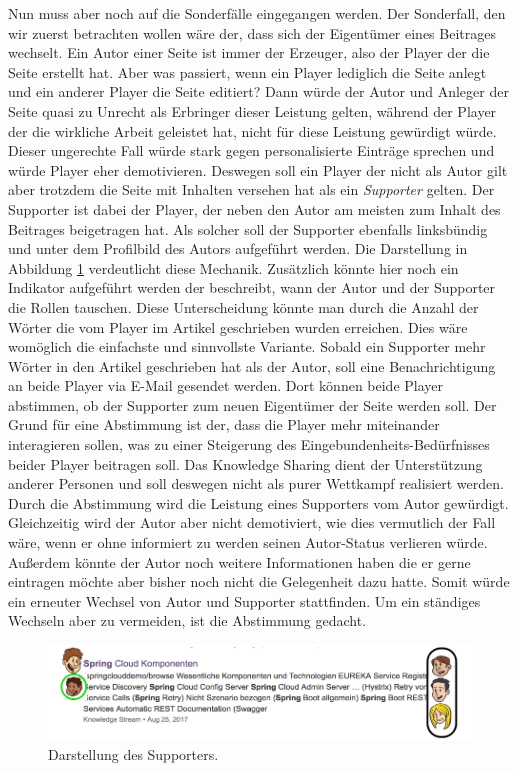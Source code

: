 \documentclass[a4paper,12pt,twoside]{scrartcl}
\begin{document}
Nun muss aber noch auf die Sonderfälle eingegangen werden. Der Sonderfall, den wir zuerst betrachten wollen wäre der, dass sich der Eigentümer eines Beitrages wechselt. Ein Autor einer Seite ist immer der Erzeuger, also der Player der die Seite erstellt hat. Aber was passiert, wenn ein Player lediglich die Seite anlegt und ein anderer Player die Seite editiert? Dann würde der Autor und Anleger der Seite quasi zu Unrecht als Erbringer dieser Leistung gelten, während der Player der die wirkliche Arbeit geleistet hat, nicht für diese Leistung gewürdigt würde. Dieser ungerechte Fall würde stark gegen personalisierte Einträge sprechen und würde Player eher demotivieren. Deswegen soll ein Player der nicht als Autor gilt aber trotzdem die Seite mit Inhalten versehen hat als ein \textit{Supporter} gelten. Der Supporter ist dabei der Player, der neben den Autor am meisten zum Inhalt des Beitrages beigetragen hat. Als solcher soll der Supporter ebenfalls linksbündig und unter dem Profilbild des Autors aufgeführt werden. Die Darstellung in Abbildung \ref{NeueSuchErgebnisseSupporter} verdeutlicht diese Mechanik. Zusätzlich könnte hier noch ein Indikator aufgeführt werden der beschreibt, wann der Autor und der Supporter die Rollen tauschen. Diese Unterscheidung könnte man durch die Anzahl der Wörter die vom Player im Artikel geschrieben wurden erreichen. Dies wäre womöglich die einfachste und sinnvollste Variante. Sobald ein Supporter mehr Wörter in den Artikel geschrieben hat als der Autor, soll eine Benachrichtigung an beide Player via E-Mail gesendet werden. Dort können beide Player abstimmen, ob der Supporter zum neuen Eigentümer der Seite werden soll. Der Grund für eine Abstimmung ist der, dass die Player mehr miteinander interagieren sollen, was zu einer Steigerung des Eingebundenheits-Bedürfnisses beider Player beitragen soll. Das Knowledge Sharing dient der Unterstützung anderer Personen und soll deswegen nicht als purer Wettkampf realisiert werden. Durch die Abstimmung wird die Leistung eines Supporters vom Autor gewürdigt. Gleichzeitig wird der Autor aber nicht demotiviert, wie dies vermutlich der Fall wäre, wenn er ohne informiert zu werden seinen Autor-Status verlieren würde. Außerdem könnte der Autor noch weitere Informationen haben die er gerne eintragen möchte aber bisher noch nicht die Gelegenheit dazu hatte. Somit würde ein erneuter Wechsel von Autor und Supporter stattfinden. Um ein ständiges Wechseln aber zu vermeiden, ist die Abstimmung gedacht.  
\\
\begin{figure}[h!]
\begin{center}
\includegraphics[scale = 0.5]{Bilder/NeueSuchErgebnisseSupporter2.png}
\caption{Darstellung des Supporters.}
\label{NeueSuchErgebnisseSupporter}
\end{center}
\end{figure}
\end{document}
